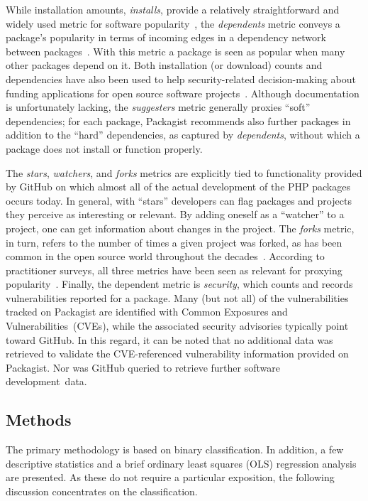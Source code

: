 \documentclass[5p, twocolumn, numbers, sort]{elsarticle}
\begin{document}
While installation amounts, \textit{installs}, provide a relatively
straightforward and widely used metric for software popularity~\cite{Herraiz11,
  Kula18, Qiu18, Ruohonen19EASE}, the \textit{dependents} metric conveys a
package's popularity in terms of incoming edges in a dependency network between
packages~\cite{Kula18}. With this metric a package is seen as popular when many
other packages depend on it. Both installation (or download) counts and
dependencies have also been used to help security-related decision-making about
funding applications for open source software
projects~\cite{Ruohonen24JSS}. Although documentation is unfortunately lacking,
the \textit{suggesters} metric generally proxies ``soft'' dependencies; for each
package, Packagist recommends also further packages in addition to the ``hard''
dependencies, as captured by \textit{dependents}, without which a package does
not install or function properly.

The \textit{stars}, \textit{watchers}, and \textit{forks} metrics are explicitly
tied to functionality provided by GitHub on which almost all of the actual
development of the PHP packages occurs today. In general, with ``stars''
developers can flag packages and projects they perceive as interesting or
relevant. By adding oneself as a ``watcher'' to a project, one can get
information about changes in the project. The \textit{forks} metric, in turn,
refers to the number of times a given project was forked, as has been common in
the open source world throughout the decades~\cite{Gencer12}. According to
practitioner surveys, all three metrics have been seen as relevant for proxying
popularity~\cite{Borges18}. Finally, the dependent metric is \textit{security},
which counts and records vulnerabilities reported for a package. Many (but not
all) of the vulnerabilities tracked on Packagist are identified with Common
Exposures and Vulnerabilities~(CVEs), while the associated security advisories
typically point toward GitHub. In this regard, it can be noted that no
additional data was retrieved to validate the CVE-referenced vulnerability
information provided on Packagist. Nor was GitHub queried to retrieve further
software development~data.

\subsection{Methods}

The primary methodology is based on binary classification. In addition, a few
descriptive statistics and a brief ordinary least squares (OLS) regression
analysis are presented. As these do not require a particular exposition, the
following discussion concentrates on the classification.
\end{document}
